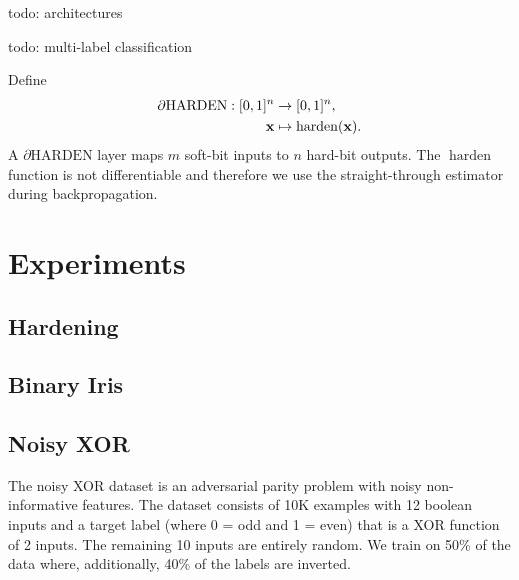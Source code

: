 \documentclass{article} %
\begin{document}
todo: architectures

todo: multi-label classification

Define
\begin{equation*}
\begin{aligned}
\partial\text{HARDEN}: [0,1]^{n} &\to [0,1]^{n}, \\
{\bf x} &\mapsto \operatorname{harden}({\bf x})\text{.}
\end{aligned}
\end{equation*}
A $\partial\text{HARDEN}$ layer maps $m$ soft-bit inputs to $n$ hard-bit outputs. The $\operatorname{harden}$ function is not differentiable and therefore we use the straight-through estimator \citep{DBLP:journals/corr/BengioLC13} during backpropagation.


\section{Experiments}

\subsection{Hardening}

\subsection{Binary Iris}

\subsection{Noisy XOR}

The noisy XOR dataset \citep{noisy-xor-dataset} is an adversarial parity problem with noisy non-informative features. The dataset consists of 10K examples with 12 boolean inputs and a target label (where 0 = odd and 1 = even) that is a XOR function of 2 inputs. The remaining 10 inputs are entirely random. We train on 50\% of the data where, additionally, 40\% of the labels are inverted.
\end{document}
